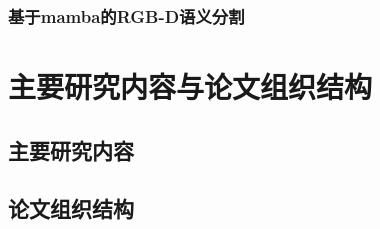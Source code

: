 \subsubsection{基于mamba的RGB-D语义分割}





\section{主要研究内容与论文组织结构}


\subsection{主要研究内容}

\subsection{论文组织结构}




